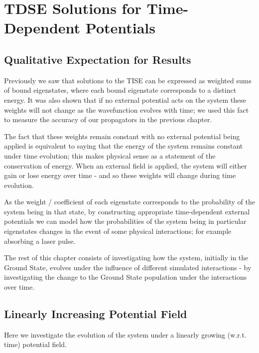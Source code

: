 
\chapter{TDSE Solutions for Time-Dependent Potentials} %

\label{Chapter4} %

\section{Qualitative Expectation for Results}
Previously we saw that solutions to the TISE can be expressed as weighted sums of bound eigenstates, where each bound eigenstate corresponds to a distinct energy. It was also shown that if no external potential acts on the system these weights will not change as the wavefunction evolves with time; we used this fact to measure the accuracy of our propagators in the previous chapter. 

The fact that these weights remain constant with no external potential being applied is equivalent to saying that the energy of the system remains constant under time evolution; this makes physical sense as a statement of the conservation of energy. When an external field is applied, the system will either gain or lose energy over time - and so these weights will change during time evolution. 

As the weight / coefficient of each eigenstate corresponds to the probability of the system being in that state, by constructing appropriate time-dependent external potentials we can model how the probabilities of the system being in particular eigenstates changes in the event of some physical interactions; for example absorbing a laser pulse. 

The rest of this chapter consists of investigating how the system, initially in the Ground State, evolves under the influence of different simulated interactions - by investigating the change to the Ground State population under the interactions over time.

\section{Linearly Increasing Potential Field}
Here we investigate the evolution of the system under a linearly growing (w.r.t. time) potential field.

